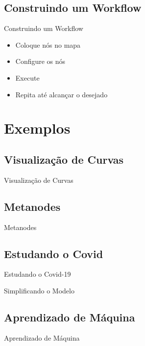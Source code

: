\documentclass{beamer}
\begin{document}
\subsection{Construindo um Workflow}

\begin{frame}{Construindo um Workflow}
    \begin{itemize}
        \item Coloque nós no mapa
        \item Configure os nós 
        \item Execute
        \item Repita até alcançar o desejado
    \end{itemize}
\end{frame}


\section{Exemplos}

\subsection{Visualização de Curvas}
\begin{frame}{Visualização de Curvas}
    \centering
    
\end{frame}


\subsection{Metanodes}
\begin{frame}{Metanodes}
    \centering
    
\end{frame}

\subsection{Estudando o Covid}
\begin{frame}{Estudando o Covid-19}
    \centering
    
\end{frame}

\begin{frame}{Simplificando o Modelo}
    \centering
    
\end{frame}

\subsection{Aprendizado de Máquina}
\begin{frame}{Aprendizado de Máquina}
    \centering
    
\end{frame}
\end{document}
